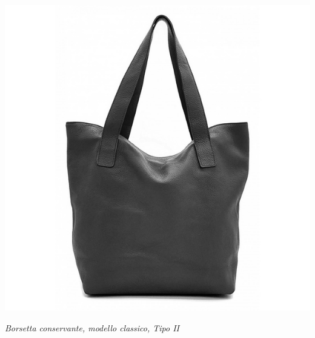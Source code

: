 \begin{center}
	\includegraphics[width=0.6\linewidth]{immagini/borsetta.png}

	\textit{Borsetta conservante, modello classico, Tipo II}
\end{center}


\medskip

